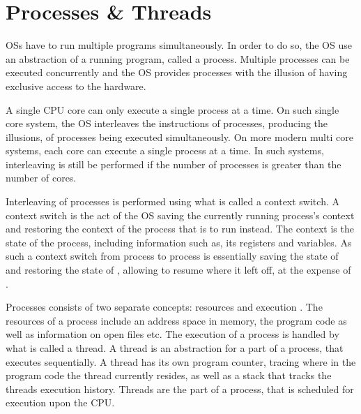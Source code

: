 \section{Processes \& Threads}\label{sec:processes_threads}
\acp{OS} have to run multiple programs simultaneously. In order to do so, the \ac{OS} use an abstraction of a running program, called a process\cite[p. 81]{tanenbaum2008modern}\cite[p. 16]{bryant2011computer}. Multiple processes can be executed concurrently and the \ac{OS} provides processes with the illusion of having exclusive access to the hardware\cite[p. 16]{bryant2011computer}. 

A single \ac{CPU} core can only execute a single process at a time. On such single core system, the \ac{OS} interleaves the instructions of processes, producing the illusions, of processes being executed simultaneously\cite[p. 16]{bryant2011computer}. On more modern multi core systems, each core can execute a single process at a time. In such systems, interleaving is still be performed if the number of processes is greater than the number of cores.

Interleaving of processes is performed using what is called a context switch\cite[p. 16]{bryant2011computer}. A context switch is the act of the \ac{OS} saving the currently running process's context and restoring the context of the process that is to run instead. The context is the state of the process, including information such as, its registers and variables\cite[p. 82]{tanenbaum2008modern}. As such a context switch from process  to process  is essentially saving the state of  and restoring the state of , allowing  to resume where it left off, at the expense of .

Processes consists of two separate concepts: resources and execution \cite[p. 98]{tanenbaum2008modern}. The resources of a process include an address space in memory, the program code as well as information on open files etc. The execution of a process is handled by what is called a thread\cite[p. 98]{tanenbaum2008modern}. A thread is an abstraction for a part of a process, that executes sequentially. A thread has its own program counter, tracing where in the program code the thread currently resides, as well as a stack that tracks the threads execution history\cite[p. 99]{tanenbaum2008modern}. Threads are the part of a process, that is scheduled for execution upon the \ac{CPU}.

